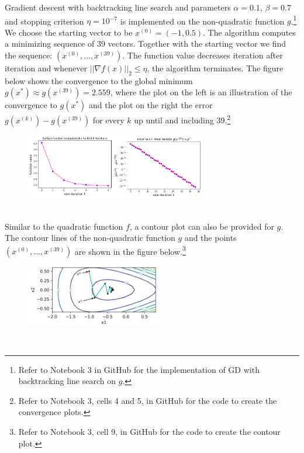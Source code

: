 Gradient descent with backtracking line search and parameters $\alpha = 0.1$, $\beta = 0.7$ and stopping criterion $\eta = 10^{-7}$ is implemented on the non-quadratic function $g$.\footnote{Refer to Notebook 3 in GitHub \cite{ThesisCode2023} for the implementation of GD with backtracking line search on $g.$} We choose the starting vector to be $x^{(0)} = (-1,0.5)$. The algorithm computes a minimizing sequence of 39 vectors. Together with the starting vector we find the sequence: $(x^{(0)},\ldots,x^{(39)}).$ The function value decreases iteration after iteration and whenever $||\nabla f(x)||_{2} \leq \eta$, the algorithm terminates. The figure below shows the convergence to the global minimum $g(x^{*}) \approx g(x^{(39)})=2.559$, where the plot on the left is an illustration of the convergence to $g(x^{*})$ and the plot on the right the error $g(x^{(k)}) - g(x^{(39)})$ for every $k$ up until and including 39.\footnote{Refer to Notebook 3, cells 4 and 5, in GitHub \cite{ThesisCode2023} for the code to create the convergence plots.} 
\begin{figure}[h!]
    \centering
        \includegraphics[width=0.7\textwidth]{Pictures/Merged_conv_exponential.png}
    \label{fig:convergence2}
\end{figure}\\
Similar to the quadratic function $f$, a contour plot can also be provided for $g.$ The contour lines of the non-quadratic function $g$ and the points $(x^{(0)},\ldots,x^{(39)})$ are shown in the figure below.\footnote{Refer to Notebook 3, cell 9, in GitHub \cite{ThesisCode2023} for the code to create the contour plot.}
\begin{figure}[h!]
    \centering
        \includegraphics[width=0.525\textwidth]{Pictures/Level sets of exponential.png}
    \label{fig:levelsets2}
\end{figure}\\
\newpage
